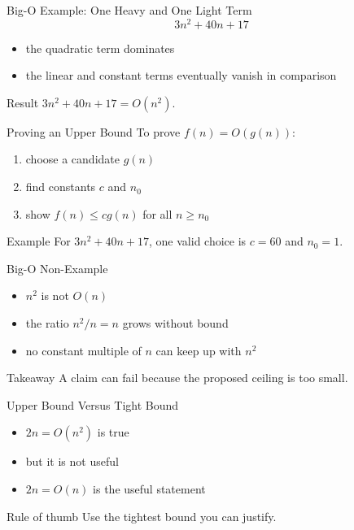 \documentclass[aspectratio=169,xcolor=dvipsnames]{beamer}
\begin{document}
\begin{frame}{Big-O Example: One Heavy and One Light Term}
  \[
    3n^2 + 40n + 17
  \]
  \begin{itemize}
    \item the quadratic term dominates
    \item the linear and constant terms eventually vanish in comparison
  \end{itemize}
  \begin{block}{Result}
    $3n^2 + 40n + 17 = O(n^2)$.
  \end{block}
\end{frame}

\begin{frame}{Proving an Upper Bound}
  To prove $f(n) = O(g(n))$:
  \begin{enumerate}
    \item choose a candidate $g(n)$
    \item find constants $c$ and $n_0$
    \item show $f(n) \le c g(n)$ for all $n \ge n_0$
  \end{enumerate}
  \begin{exampleblock}{Example}
    For $3n^2 + 40n + 17$, one valid choice is $c = 60$ and $n_0 = 1$.
  \end{exampleblock}
\end{frame}

\begin{frame}{Big-O Non-Example}
  \begin{itemize}
    \item $n^2$ is not $O(n)$
    \item the ratio $n^2 / n = n$ grows without bound
    \item no constant multiple of $n$ can keep up with $n^2$
  \end{itemize}
  \begin{alertblock}{Takeaway}
    A claim can fail because the proposed ceiling is too small.
  \end{alertblock}
\end{frame}

\begin{frame}{Upper Bound Versus Tight Bound}
  \begin{itemize}
    \item $2n = O(n^2)$ is true
    \item but it is not useful
    \item $2n = O(n)$ is the useful statement
  \end{itemize}
  \begin{block}{Rule of thumb}
    Use the tightest bound you can justify.
  \end{block}
\end{frame}
\end{document}
